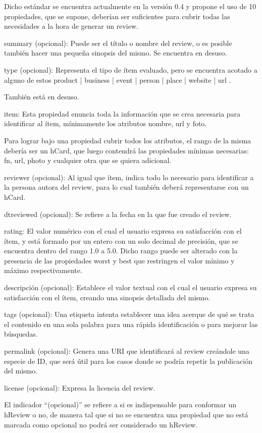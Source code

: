 Dicho estándar se encuentra actualmente en la versión 0.4 y propone el uso de 10 propiedades, que se supone, deberían ser 
suficientes para cubrir todas las necesidades a la hora de generar un review.

summary (opcional): Puede ser el título o nombre del review, o es posible también hacer una pequeña sinopsis del mismo. Se encuentra en desuso.

type (opcional): Representa el tipo de ítem evaluado, pero se encuentra acotado a alguno de estos  product | business | event | person | place | website | url .


También está en desuso.

item: Esta propiedad enuncia toda la información que se crea necesaria para identificar al ítem, mínimamente los atributos nombre, url y foto.


Para lograr bajo una propiedad cubrir todos los atributos, el rango de la misma debería ser un hCard, que luego contendrá las propiedades mínimas necesarias: 
fn, url, photo y cualquier otra que se quiera adicional.

reviewer (opcional): Al igual que ítem, indica todo lo necesario para identificar a la persona autora del review, para lo cual también deberá representarse 
con un hCard. 

dtreviewed (opcional): Se refiere a la fecha en la que fue creado el review. 

rating: El valor numérico con el cual el usuario expresa su satisfacción con el ítem, y está formado por un entero con un solo decimal 
de precisión, que se encuentra dentro del rango 1.0 a 5.0. Dicho rango puede ser alterado con la presencia de las propiedades worst y best 
que restringen el valor mínimo y máximo respectivamente.

descripción (opcional): Establece el valor textual con el cual el usuario expresa su satisfacción con el ítem, creando una 
sinopsis detallada del mismo. 

tags (opcional): Una etiqueta intenta establecer una idea acerque de qué se trata el contenido en una sola palabra para una rápida identificación 
o para mejorar las búsquedas. 

permalink (opcional): Genera una URI que identificará al review creándole una especie de ID, que será útil para los casos donde 
se podría repetir la publicación del mismo. 

license (opcional): Expresa la licencia del review.

El indicador ``(opcional)'' se refiere a si es indispensable para conformar un hReview o no, de manera tal que si no se encuentra una 
propiedad que no está marcada como opcional no podrá ser considerado un hReview.

